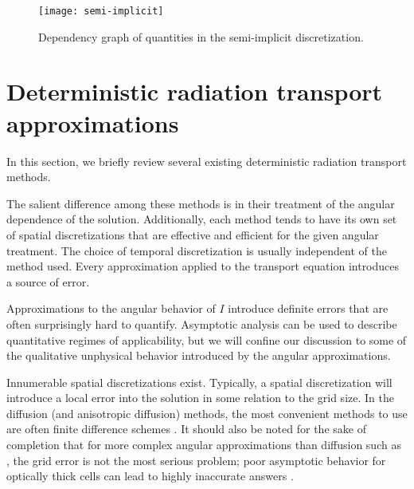 \begin{sidewaysfigure}[hp]
  \centering
  \texttt{[image: semi-implicit]}
  \caption{Dependency graph of quantities in the semi-implicit discretization.}
  \label{fig:semiImplicitFlowchart}
\end{sidewaysfigure}

\clearpage
\section{Deterministic radiation transport approximations}
\label{sec:bgApproxMethods}

In this section, we briefly review several existing deterministic radiation transport methods.

The salient difference among these methods is in their treatment of
the angular dependence of the solution. Additionally, each method tends to have
its own set of spatial discretizations that are effective and efficient for the
given angular treatment. The choice of temporal discretization is usually
independent of the method used. Every approximation applied to the transport
equation introduces a source of error.

Approximations to the angular behavior of $I$ introduce definite errors
that are often surprisingly hard to quantify. Asymptotic analysis can be used to
describe quantitative regimes of applicability, but we will confine our
discussion to some of the qualitative unphysical behavior introduced by the
angular approximations.

Innumerable spatial discretizations exist. Typically, a
spatial discretization will introduce a local error into the solution in some
relation to the grid size. In the diffusion (and anisotropic diffusion) methods,
the most convenient methods to use are often finite difference schemes
\cite{Lev2007}. It should also be noted for the sake of completion that for more
complex angular approximations than diffusion such as \SN, the grid error is not
the most serious problem; poor asymptotic behavior for optically
thick cells can lead to highly inaccurate answers \cite{Ada1998a,Ada2001}.

